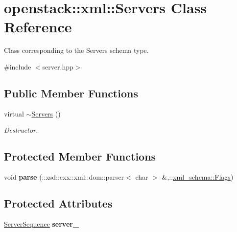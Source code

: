 \hypertarget{classopenstack_1_1xml_1_1Servers}{
\section{openstack::xml::Servers Class Reference}
\label{classopenstack_1_1xml_1_1Servers}
}


Class corresponding to the Servers schema type.  




{\ttfamily \#include $<$server.hpp$>$}

\subsection*{Public Member Functions}
\begin{DoxyCompactItemize}
\item 
\hypertarget{classopenstack_1_1xml_1_1Servers_a0c36c4f10b1ee79cb58f0c5979bc97de}{
virtual \hyperlink{classopenstack_1_1xml_1_1Servers_a0c36c4f10b1ee79cb58f0c5979bc97de}{$\sim$Servers} ()}
\label{classopenstack_1_1xml_1_1Servers_a0c36c4f10b1ee79cb58f0c5979bc97de}

\begin{DoxyCompactList}\small\item\em Destructor. \item\end{DoxyCompactList}\end{DoxyCompactItemize}
\subsection*{Protected Member Functions}
\begin{DoxyCompactItemize}
\item 
\hypertarget{classopenstack_1_1xml_1_1Servers_aca00774f16eaa8ac8c3497900a46c92d}{
void {\bfseries parse} (::xsd::cxx::xml::dom::parser$<$ char $>$ \&,::\hyperlink{namespacexml__schema_affb4c227cbd9aa7453dd1dc5a1401943}{xml\_\-schema::Flags})}
\label{classopenstack_1_1xml_1_1Servers_aca00774f16eaa8ac8c3497900a46c92d}

\end{DoxyCompactItemize}
\subsection*{Protected Attributes}
\begin{DoxyCompactItemize}
\item 
\hypertarget{classopenstack_1_1xml_1_1Servers_a3bf7ed23f0a97a95e1df1ee654b82a75}{
\hyperlink{classopenstack_1_1xml_1_1Servers_a9cc28e68df0ebb654db381f4bc6b43e0}{ServerSequence} {\bfseries server\_\-}}
\label{classopenstack_1_1xml_1_1Servers_a3bf7ed23f0a97a95e1df1ee654b82a75}

\end{DoxyCompactItemize}
